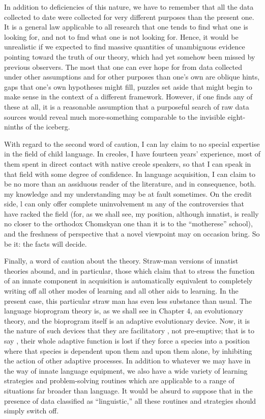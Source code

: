In addition to deficiencies of this nature, we have to remember that all the data collected to date were collected for very different purposes than the present one. It is a general law applicable to all research that one tends to find what one is looking for, and not to fmd what one is not looking for. Hence, it would be unrealistic if we expected to find massive quantities of unambiguous evidence pointing toward the truth of our theory, which had yet somehow been missed by previous observers. The most that one can ever hope for from data collected under other assumptions and for other purposes than one's own are oblique hints, gaps that one's own hypotheses might fill, puzzles set aside that might begin to make sense in the context of a different framework. However, if one finds any of these at all, it is a reasonable assumption that a purposeful search of raw data sources would reveal much more-something comparable to the invisible eight-ninths of the iceberg.

With regard to the second word of caution, I can lay claim to no special expertise in the field of child language. In creoles, I have fourteen years' experience, most of them spent in direct contact with native creole speakers, so that I can speak in that field with some degree of confidence. In language acquisition, I can claim to be no
more than an assiduous reader of the literature, and in consequence, both. my knowledge and my understanding may be at fault sometimes. On the credit side, l can only offer complete uninvolvement m any of the controversies that have racked the field (for, as we shall see, my position, although innatist, is really no closer to the orthodox Chomskyan one than it is to the ``motherese'' school), and the freshness
of perspective that a novel viewpoint may on occasion bring. So be it: the facts will decide.

Finally, a word of caution about the theory. Straw-man versions
of innatist theories abound, and in particular, those which claim that to stress the function of an innate component in acquisition is auto\-matically equivalent to completely writing off all other modes of learning and all other aids to learning. In the present case, this par\-ticular straw man has even less substance than usual. The language bioprogram theory is, as we shall see in Chapter 4, an evolutionary theory, and the bioprogram itself is an adaptive evolutionary device. Now, it is the nature of such devices that they are facilitatory , not pre-emptive; that is to say , their whole adaptive function is lost if they force a species into a position where that species is dependent upon them and upon them alone, by inhibiting the action of other adaptive processes. In addition to whatever we may have in the way of innate language equipment, we also have a wide variety of learning strategies and problem-solving routines which are applicable to a range of situations far broader than language. It would be absurd to suppose that in the presence of data classified as ``linguistic,'' all these routines and strategies should simply switch off.


